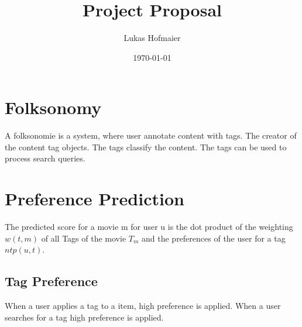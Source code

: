 \documentclass[11pt]{article}
\title{Project Proposal}
\author{Lukas Hofmaier}
\date{\today}
\begin{document}
\maketitle

\section{Folksonomy}
\label{folksonomy}
A folksonomie is a system, where user annotate content with tags. The creator of the content tag objects. The tags classify the content.
The tags can be used to process search queries.

\section{Preference Prediction}
The predicted score for a movie m for user u is the dot product of the weighting $w(t,m)$ of all Tags of the movie $T_m$ and the preferences of the user for a tag $ntp(u,t)$.

\subsection{Tag Preference}
When a user applies a tag to a item, high preference is applied.
When a user searches for a tag high preference is applied.
\end{document}

